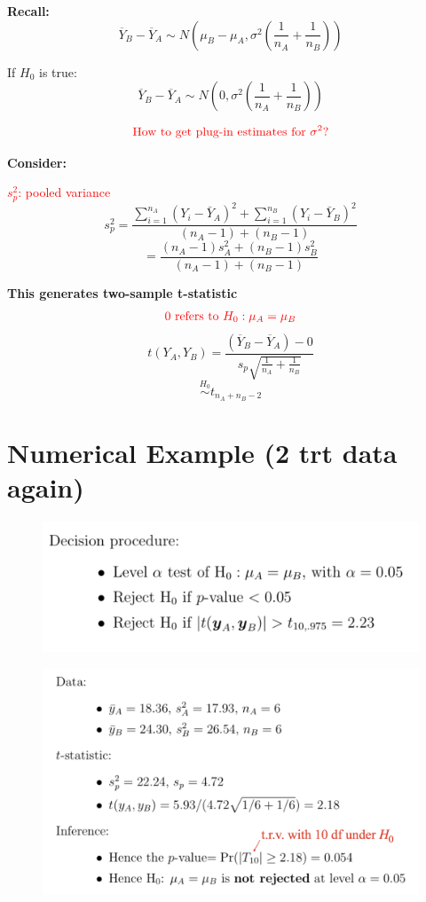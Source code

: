 \documentclass[14pt]{extarticle}
\begin{document}
\textbf{Recall:}
\[
\overline{Y}_B - \overline{Y}_A \sim N(\mu_B - \mu_A, \sigma^2 \left( \frac{1}{n_A} + \frac{1}{n_B} \right))
\]

If $H_0$ is true:
\[
\overline{Y}_B - \overline{Y}_A \sim N(0, \sigma^2 \left( \frac{1}{n_A} + \frac{1}{n_B} \right))
\]

\[\textcolor{red}{\text{How to get plug-in estimates for }\sigma^2 ?}\]

\textbf{Consider: }

\textcolor{red}{$s_p^2$: pooled variance}
\[
s_p^2 = \frac{\sum_{i=1}^{n_A} (Y_i - \bar{Y}_A)^2 + \sum_{i=1}^{n_B} (Y_i - \bar{Y}_B)^2}{(n_A-1) + (n_B-1)}
\]
\[
= \frac{(n_A-1)s_A^2 + (n_B-1)s_B^2}{(n_A-1) + (n_B-1)}
\]

\newpage

\textbf{This generates two-sample t-statistic}
\[\textcolor{red}{0 \text{ refers to } H_0 : \mu_A = \mu_B}\]
\[
t(Y_A, Y_B) = \frac{(\overline{Y}_B - \overline{Y}_A) - 0}{s_p \sqrt{\frac{1}{n_A} + \frac{1}{n_B}}}
\]
\[
\overset{H_0}{\sim}  t_{n_A + n_B - 2}
\]

\section*{Numerical Example (2 trt data again) } 
\begin{figure}[H]
    \centering
    \includegraphics[width=1\textwidth]{fig13.png}
\end{figure}

\begin{figure}[H]
    \centering
    \includegraphics[width=1\textwidth]{fig14.png}
\end{figure}
\end{document}
